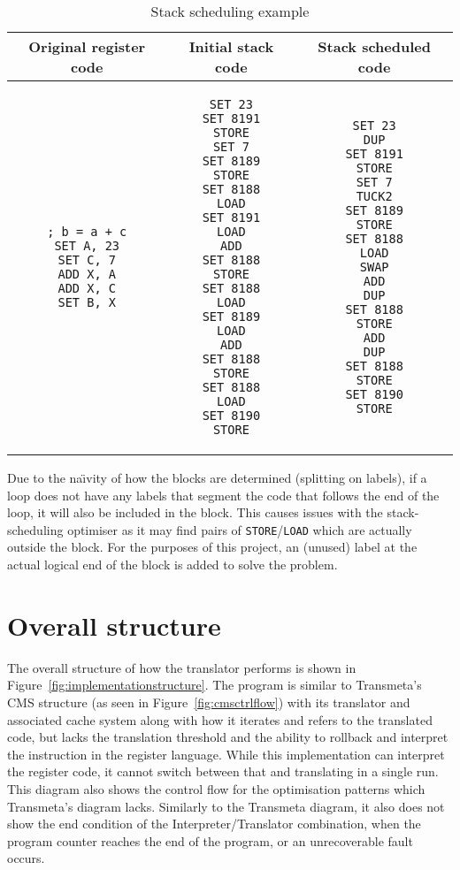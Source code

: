 \begin{table}
\caption{Stack scheduling example}
\begin{tabular}{c c c}\label{tab:scheduleex}
Original register code & Initial stack code & Stack scheduled code \\ \toprule
\begin{lstlisting}
; b = a + c
SET A, 23
SET C, 7
ADD X, A
ADD X, C
SET B, X
\end{lstlisting} &
\begin{lstlisting}
SET 23
SET 8191
STORE
SET 7
SET 8189
STORE
SET 8188
LOAD
SET 8191
LOAD
ADD
SET 8188
STORE
SET 8188
LOAD
SET 8189
LOAD
ADD
SET 8188
STORE
SET 8188
LOAD
SET 8190
STORE
\end{lstlisting} &
\begin{lstlisting}
SET 23
DUP
SET 8191
STORE
SET 7
TUCK2
SET 8189
STORE
SET 8188
LOAD
SWAP
ADD
DUP
SET 8188
STORE
ADD
DUP
SET 8188
STORE
SET 8190
STORE
\end{lstlisting} \\ \bottomrule
\end{tabular}
\end{table}

Due to the na{\"\i}vity of how the blocks are determined (splitting on labels),
if a loop does not have any labels that segment the code that follows the end of
the loop, it will also be included in the block.  This causes issues with the
stack-scheduling optimiser as it may find pairs of \texttt{STORE}/\texttt{LOAD}
which are actually outside the block. For the purposes of this project, an
(unused) label at the actual logical end of the block is added to solve the
problem.

\section{Overall structure}
The overall structure of how the translator performs is shown in
Figure~\ref{fig:implementationstructure}. The program is similar to Transmeta's
CMS structure (as seen in Figure~\ref{fig:cmsctrlflow}) with its translator and
associated cache system along with how it iterates and refers to the translated
code, but lacks the translation threshold and the ability to rollback and
interpret the instruction in the register language. While this implementation
can interpret the register code, it cannot switch between that and translating
in a single run. This diagram also shows the control flow for the optimisation
patterns which Transmeta's diagram lacks. Similarly to the Transmeta diagram, it
also does not show the end condition of the Interpreter/Translator combination,
when the program counter reaches the end of the program, or an unrecoverable
fault occurs.

